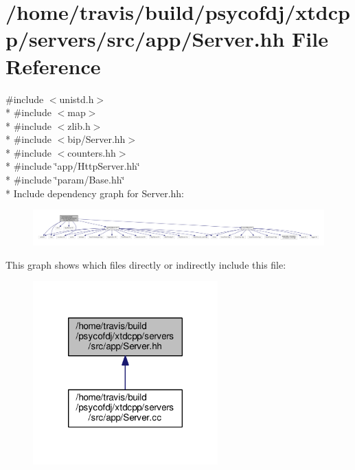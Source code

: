 \hypertarget{Server_8hh}{\section{/home/travis/build/psycofdj/xtdcpp/servers/src/app/\-Server.hh File Reference}
\label{Server_8hh}
}
{\ttfamily \#include $<$unistd.\-h$>$}\\*
{\ttfamily \#include $<$map$>$}\\*
{\ttfamily \#include $<$zlib.\-h$>$}\\*
{\ttfamily \#include $<$bip/\-Server.\-hh$>$}\\*
{\ttfamily \#include $<$counters.\-hh$>$}\\*
{\ttfamily \#include \char`\"{}app/\-Http\-Server.\-hh\char`\"{}}\\*
{\ttfamily \#include \char`\"{}param/\-Base.\-hh\char`\"{}}\\*
Include dependency graph for Server.\-hh\-:
\nopagebreak
\begin{figure}[H]
\begin{center}
\leavevmode
\includegraphics[width=350pt]{Server_8hh__incl}
\end{center}
\end{figure}
This graph shows which files directly or indirectly include this file\-:
\nopagebreak
\begin{figure}[H]
\begin{center}
\leavevmode
\includegraphics[width=202pt]{Server_8hh__dep__incl}
\end{center}
\end{figure}
